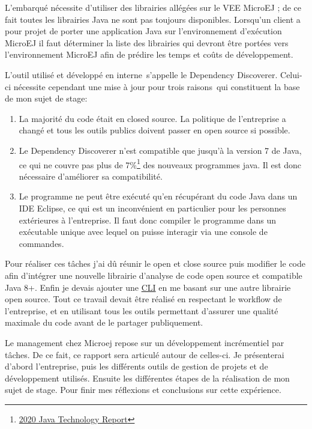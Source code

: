 \documentclass[french,a4paper,12pt]{report}
\begin{document}
L'embarqué nécessite d’utiliser des librairies allégées sur le VEE MicroEJ ; de ce fait toutes les librairies Java ne sont pas toujours disponibles. Lorsqu’un client a pour projet de porter une application Java sur l’environnement d’exécution MicroEJ il faut déterminer la liste des librairies qui devront être portées vers l’environnement MicroEJ afin de prédire les temps et coûts de développement.

L’outil utilisé et développé en interne s’appelle le Dependency Discoverer. Celui-ci nécessite cependant une mise à jour pour trois raisons qui constituent la base de mon sujet de stage:

\begin{enumerate}
\item  La majorité du code était en closed source. La politique de l’entreprise a changé et tous les outils publics doivent passer en open source si possible.
\item Le Dependency Discoverer n’est compatible que jusqu’à la version 7 de Java, ce qui ne couvre pas plus de 7\%\footnote{\href{https://www.jrebel.com/blog/2020-java-technology-report}{2020 Java Technology Report}} des nouveaux programmes java. Il est donc nécessaire d’améliorer sa compatibilité. 
\item  Le programme ne peut être exécuté qu’en récupérant du code Java dans un IDE Eclipse, ce qui est un inconvénient en particulier pour les personnes extérieures à l’entreprise. Il faut donc compiler le programme dans un exécutable unique avec lequel on puisse interagir via une console de commandes.
\end{enumerate}

Pour réaliser ces tâches j’ai dû réunir le open et close source puis modifier le code afin d’intégrer une nouvelle librairie d’analyse de code open source et compatible Java 8+. Enfin je devais ajouter une \hyperlink{CLI}{CLI} en me basant sur une autre librairie open source.
Tout ce travail devait être réalisé en respectant le workflow de l’entreprise, et en utilisant tous les outils permettant d’assurer une qualité maximale du code avant de le partager publiquement.

Le management chez Microej repose sur un développement incrémentiel par tâches. De ce fait, ce rapport sera articulé autour de celles-ci. Je présenterai d’abord l’entreprise, puis les différents outils de gestion de projets et de développement utilisés. Ensuite les différentes étapes de la réalisation de mon sujet de stage. Pour finir mes réflexions et conclusions sur cette expérience. 
\end{document}
